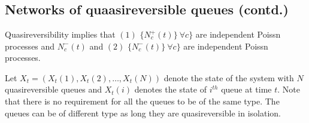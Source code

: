 \documentclass[all-lectures.tex]{subfiles}
\begin{document}

\setcounter{section}{4}
\setcounter{subsection}{1}

\section*{}
\subsection{Networks of quaasireversible queues (contd.)}
Quasireversibility implies that $(1)$ $\{N^+_c(t)\}\ \forall c\}$ are independent Poissn processes and $N_c^-(t)$  and $(2)$ $\{N^-_c(t)\}\ \forall c\}$ are independent Poissn processes.

\indent Let $X_t = (X_t(1),X_t(2),\dots,X_t(N))$ denote the state of the system with $N$ quasireversible queues and $X_t(i)$ denotes the state of $i^{th}$ queue at time $t$. Note that there is no requirement for all the queues to be of the same type. The queues can be of different type as long they are quasireversible in isolation. 
\end{document}
